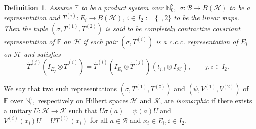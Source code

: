 \documentclass[12pt]{amsart}
\numberwithin{equation}{section}
\theoremstyle{plain}
\newtheorem{definition}[theorem]{Definition}
\newcommand{\be}{\mathbb E}
\newcommand{\ot}{\otimes}
\newcommand{\wt}{\widetilde}
\newcommand{\wT}{\wt{T}}
\begin{document}
\begin{definition}
	Assume $\be$ to be a product system over $\mathbb N^2_0,$ $\sigma:\mathcal{B}\to B(\mathcal H)$ to be a representation and $T^{(i)}: E_i\to B(\mathcal H)$, $i\in I_2:=\{1,2\}$ to be the linear maps. Then the tuple $(\sigma, T^{(1)}, T^{(2)})$ is said to be {\rm completely contractive covariant representation} of $\be$ on $\mathcal{H}$ if each pair $(\sigma, T^{(i)})$ is a c.c.c. representation of $E_i$ on $\mathcal{H}$ and satisfies
	\begin{equation} \label{rep} \wT^{(j)} (I_{E_j} \ot \wT^{(i)}) = \wT^{(i)} (I_{E_i} \ot \wT^{(j)}) (t_{j,i} \ot I_{\mathcal H}),\quad \quad  j,i\in I_2.
	\end{equation}
\end{definition}
	
	
	We say that two such representations $(\sigma, T^{(1)}, T^{(2)})$ and $(\psi, V^{(1)}, V^{(2)})$ of $\be$ over $\mathbb N^2_0,$
	respectively on Hilbert spaces $\mathcal H$ and $\mathcal K$, are {\it isomorphic} if there exists a unitary $U:\mathcal H \to
	\mathcal K$ such that $U\sigma(a)=\psi(a)U$ and $V^{(i)}(x_i)U = U T^{(i)} (x_i)$ for all $a\in \mathcal{B}$ and $x_i\in E_i,i\in I_2.$ 
	
\end{document}
